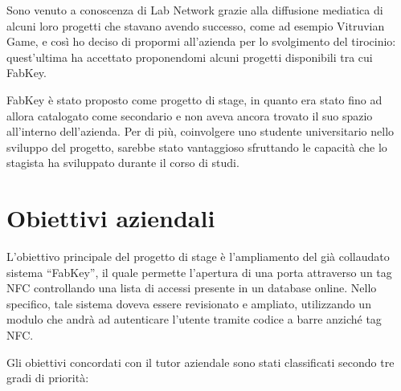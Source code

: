 
\medskip

Sono venuto a conoscenza di Lab Network grazie alla diffusione mediatica di alcuni loro progetti che stavano avendo successo, come ad esempio Vitruvian Game, e così ho deciso di propormi all'azienda per lo svolgimento del tirocinio: quest'ultima ha accettato proponendomi alcuni progetti disponibili tra cui FabKey.


\medskip

FabKey è stato proposto come progetto di stage, in quanto era stato fino ad allora catalogato come secondario e non aveva ancora trovato il suo spazio all'interno dell'azienda. Per di più, coinvolgere uno studente universitario nello sviluppo del progetto, sarebbe stato vantaggioso sfruttando le capacità che lo stagista ha sviluppato durante il corso di studi.

\section{Obiettivi aziendali}
L'obiettivo principale del progetto di stage è l'ampliamento del già collaudato sistema ``FabKey'', il quale permette l'apertura di una porta attraverso un tag NFC controllando una lista di accessi presente in un database online. Nello specifico, tale sistema doveva essere revisionato e ampliato, utilizzando un modulo che andrà ad autenticare l'utente tramite codice a barre anziché tag NFC.

Gli obiettivi concordati con il tutor aziendale sono stati classificati secondo tre gradi di priorità:

